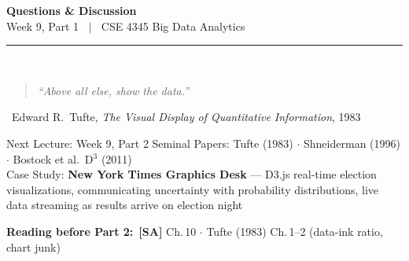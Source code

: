\documentclass[aspectratio=169,10pt]{beamer}
\begin{document}
\begin{frame}[c]
  \begin{center}
    {\Large\bfseries Questions \& Discussion}\\[10pt]
    {\large Week 9, Part 1 $\;\mid\;$ CSE 4345 Big Data Analytics}\\[8pt]
    \textcolor{PUGray}{\rule{7cm}{0.5pt}}\\[10pt]
    \begin{quote}
      \itshape ``Above all else, show the data.''
    \end{quote}
    \hfill\textemdash\ Edward R.\ Tufte, \textit{The Visual Display of Quantitative Information}, 1983
    \vspace{12pt}
    \begin{block}{\centering Next Lecture: Week 9, Part 2}
      \centering
      Seminal Papers: Tufte (1983) $\cdot$ Shneiderman (1996) $\cdot$ Bostock et al.\ D$^3$ (2011)\\[4pt]
      \small Case Study: \textbf{New York Times Graphics Desk} ---
      D3.js real-time election visualizations, communicating uncertainty with probability distributions, live data streaming as results arrive on election night
    \end{block}
    \vspace{6pt}
    \textbf{Reading before Part 2:}\ \textbf{[SA]} Ch.\,10 $\cdot$ Tufte (1983) Ch.\,1--2 (data-ink ratio, chart junk)
  \end{center}
\end{frame}

\end{document}
